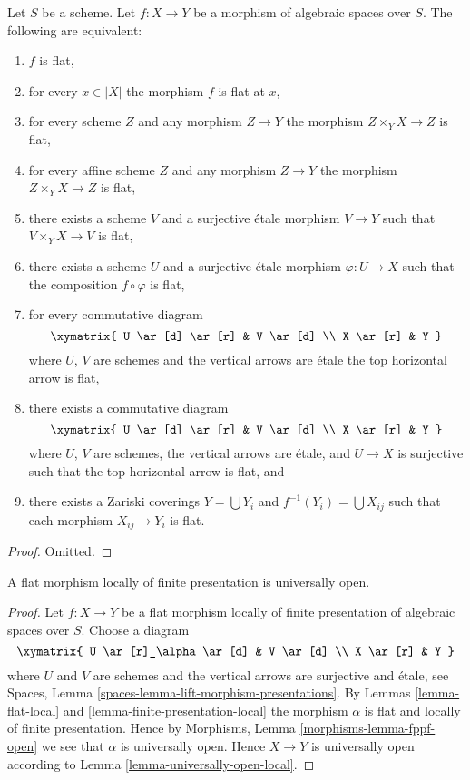 \begin{lemma}
\label{lemma-flat-local}
Let $S$ be a scheme.
Let $f : X \to Y$ be a morphism of algebraic spaces over $S$.
The following are equivalent:
\begin{enumerate}
\item $f$ is flat,
\item for every $x \in |X|$ the morphism $f$ is flat at $x$,
\item for every scheme $Z$ and any morphism $Z \to Y$ the morphism
$Z \times_Y X \to Z$ is flat,
\item for every affine scheme $Z$ and any morphism
$Z \to Y$ the morphism $Z \times_Y X \to Z$ is flat,
\item there exists a scheme $V$ and a surjective \'etale morphism
$V \to Y$ such that $V \times_Y X \to V$ is flat,
\item there exists a scheme $U$ and a surjective \'etale morphism
$\varphi : U \to X$ such that the composition $f \circ \varphi$
is flat,
\item for every commutative diagram
$$
\xymatrix{
U \ar[d] \ar[r] & V \ar[d] \\
X \ar[r] & Y
}
$$
where $U$, $V$ are schemes and the vertical arrows are \'etale
the top horizontal arrow is flat,
\item there exists a commutative diagram
$$
\xymatrix{
U \ar[d] \ar[r] & V \ar[d] \\
X \ar[r] & Y
}
$$
where $U$, $V$ are schemes, the vertical arrows are \'etale, and
$U \to X$ is surjective such that the top horizontal arrow is flat, and
\item there exists a Zariski coverings $Y = \bigcup Y_i$ and
$f^{-1}(Y_i) = \bigcup X_{ij}$ such that
each morphism $X_{ij} \to Y_i$ is flat.
\end{enumerate}
\end{lemma}

\begin{proof}
Omitted.
\end{proof}

\begin{lemma}
\label{lemma-fppf-open}
A flat morphism locally of finite presentation is universally open.
\end{lemma}

\begin{proof}
Let $f : X \to Y$ be a flat morphism locally of finite presentation
of algebraic spaces over $S$. Choose a diagram
$$
\xymatrix{
U \ar[r]_\alpha \ar[d] & V \ar[d] \\
X \ar[r] & Y
}
$$
where $U$ and $V$ are schemes and the vertical arrows are surjective and
\'etale, see
Spaces, Lemma \ref{spaces-lemma-lift-morphism-presentations}.
By
Lemmas \ref{lemma-flat-local} and \ref{lemma-finite-presentation-local}
the morphism $\alpha$ is flat and locally of finite presentation.
Hence by
Morphisms, Lemma \ref{morphisms-lemma-fppf-open}
we see that $\alpha$ is universally open.
Hence $X \to Y$ is universally open according to
Lemma \ref{lemma-universally-open-local}.
\end{proof}

